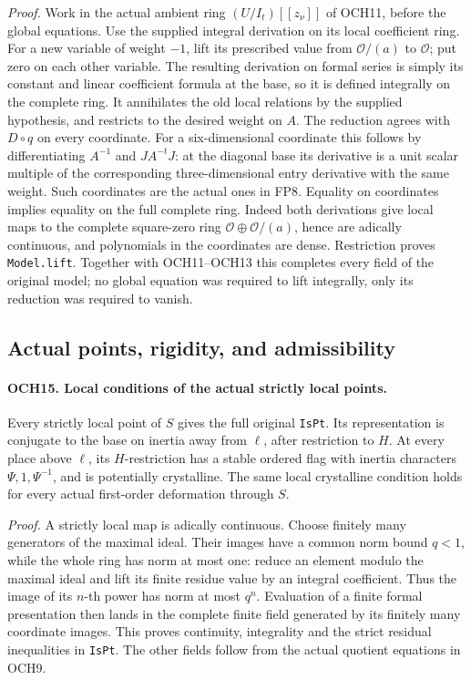 \documentclass[11pt,a4paper]{article}
\numberwithin{equation}{section}
\theoremstyle{remark}\newtheorem{remark}[theorem]{Remark}
\begin{document}
\emph{Proof.}
Work in the actual ambient ring \((U/I_t)[[z_\nu]]\) of
OCH11, before the global equations.  Use the supplied integral
derivation on its local coefficient ring.  For a new variable of
weight \(-1\), lift its prescribed value from \(\mathcal O/(a)\)
to \(\mathcal O\); put zero on each other variable.
The resulting derivation on formal series is simply its constant
and linear coefficient formula at the base, so it is defined
integrally on the complete ring.  It annihilates the old local
relations by the supplied hypothesis, and restricts to the desired
weight on \(A\).
The reduction agrees with \(D\circ q\) on every coordinate.
For a six-dimensional coordinate this follows by differentiating
\(A^{-1}\) and \(JA^{-t}J\): at the diagonal base its derivative
is a unit scalar multiple of the corresponding three-dimensional
entry derivative with the same weight.  Such coordinates are the
actual ones in FP8.  Equality on coordinates implies equality on
the full complete ring.  Indeed both derivations give local maps
to the complete square-zero ring
\(\mathcal O\oplus\mathcal O/(a)\), hence are adically
continuous, and polynomials in the coordinates are dense.
Restriction proves \texttt{Model.\allowbreak lift}.  Together with
OCH11--OCH13 this completes every field of the original model;
no global equation was required to lift integrally, only its
reduction was required to vanish.

\subsection{Actual points, rigidity, and admissibility}

\paragraph{OCH15. Local conditions of the actual strictly local points.}
\label{claim:OCH15}
Every strictly local point of \(S\) gives the full original
\texttt{Is\allowbreak Pt}.  Its representation is conjugate to the base on
inertia away from \(\ell\), after restriction to \(H\).
At every place above \(\ell\), its \(H\)-restriction has a
stable ordered flag with inertia characters
\(\Psi,1,\Psi^{-1}\), and is potentially crystalline.
The same local crystalline condition holds for every actual
first-order deformation through \(S\).

\emph{Proof.}
A strictly local map is adically continuous.  Choose finitely many
generators of the maximal ideal.  Their images have a common norm
bound \(q<1\), while the whole ring has norm at most one:
reduce an element modulo the maximal ideal and lift its finite
residue value by an integral coefficient.  Thus the image of its
\(n\)-th power has norm at most \(q^n\).
Evaluation of a finite formal presentation then lands in the
complete finite field generated by its finitely many coordinate
images.  This proves continuity, integrality and the strict
residual inequalities in \texttt{Is\allowbreak Pt}.  The other fields follow
from the actual quotient equations in OCH9.
\end{document}
